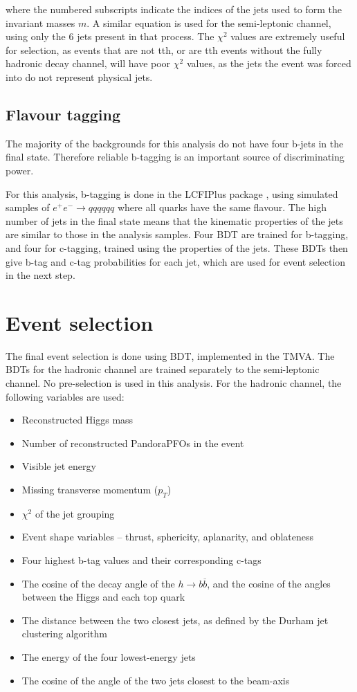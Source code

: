 where the numbered subscripts indicate the indices of the jets used to form the invariant masses $m$. A similar equation is used for the semi-leptonic channel, using only the 6 jets present in that process. The $\chi^2$ values are extremely useful for selection, as events that are not tth, or are tth events without the fully hadronic decay channel, will have poor $\chi^2$ values, as the jets the event was forced into do not represent physical jets.

\subsection{Flavour tagging}
The majority of the backgrounds for this analysis do not have four b-jets in the final state. Therefore reliable b-tagging is an important source of discriminating power.

For this analysis, b-tagging is done in the LCFIPlus package \cite{lcfiplus}, using simulated samples of $e^+ e^- \rightarrow qqqqqq$ where all quarks have the same flavour. The high number of jets in the final state means that the kinematic properties of the jets are similar to those in the analysis samples. Four \acrfull{BDT} are trained for b-tagging, and four for c-tagging, trained using the properties of the jets. These \acrshort{BDT}s then give b-tag and c-tag probabilities for each jet, which are used for event selection in the next step.

\section{Event selection}
The final event selection is done using \acrfull{BDT}, implemented in the \acrfull{TMVA}. The \acrshort{BDT}s for the hadronic channel are trained separately to the semi-leptonic channel. No pre-selection is used in this analysis. For the hadronic channel, the following variables are used:

\begin{itemize}
	\item Reconstructed Higgs mass
	\item Number of reconstructed PandoraPFOs in the event
	\item Visible jet energy
	\item Missing transverse momentum ($p_T$)
	\item $\chi^2$ of the jet grouping
	\item Event shape variables -- thrust, sphericity, aplanarity, and oblateness
	\item Four highest b-tag values and their corresponding c-tags
	\item The cosine of the decay angle of the $h \rightarrow b\overline{b}$, and the cosine of the angles between the Higgs and each top quark
	\item The distance between the two closest jets, as defined by the Durham jet clustering algorithm
	\item The energy of the four lowest-energy jets
	\item The cosine of the angle of the two jets closest to the beam-axis
\end{itemize}

